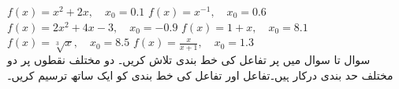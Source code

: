 $f(x)=x^2+2x,\quad x_0=0.1$
$f(x)=x^{-1},\quad x_0=0.6$
$f(x)=2x^2+4x-3,\quad x_0=-0.9$
$f(x)=1+x,\quad x_0=8.1$
$f(x)=\sqrt[3]{x},\quad x_0=8.5$
$f(x)=\tfrac{x}{x+1},\quad x_0=1.3$
\\
سوال  تا سوال  میں  پر تفاعل  کی خط بندی تلاش کریں۔ دو مختلف نقطوں پر دو مختلف حد بندی درکار ہیں۔تفاعل اور تفاعل کی خط بندی کو ایک ساتھ ترسیم کریں۔

